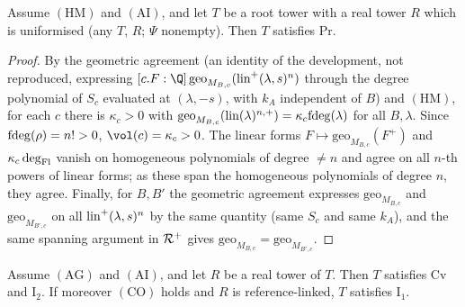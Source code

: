 \begin{proposition}[Proportionality]\label{pf:volthm:prop:prop}
Assume $(\mathrm{HM})$ and $(\mathrm{AI})$, and let $T$ be a root tower with a real tower $R$ which
is uniformised (any $T$, $R$; $\Psi$ nonempty). Then $T$ satisfies $\mathrm{Pr}$.
\end{proposition}

\begin{proof}
By the geometric agreement  (an identity of the development, not
reproduced, expressing $[c.F:\Q]\,\mathrm{geo}_{M_{B,c}}(\volthmlin^+(\lambda,s)^n)$ through the degree polynomial of
$S_c$ evaluated at $(\lambda,-s)$, with $k_A$ independent of $B$) and $(\mathrm{HM})$, for each $c$ there is
$\kappa_c>0$ with $\mathrm{geo}_{M_{B,c}}(\mathrm{lin}(\lambda)^{n,+})=\kappa_c\mathrm{fdeg}(\lambda)$ for all $B,\lambda$.
Since $\mathrm{fdeg}(\rho)=n!>0$, $\vol(c)=\kappa_c>0$. The linear forms
$F\mapsto\mathrm{geo}_{M_{B,c}}(F^+)$ and $\kappa_c\deg_{\mathrm{Fl}}$ vanish on homogeneous polynomials of degree $\ne n$ and
agree on all $n$-th powers of linear forms; as these span the homogeneous polynomials of degree $n$, they agree.
Finally, for $B,B'$ the geometric agreement expresses $\mathrm{geo}_{M_{B,c}}$ and $\mathrm{geo}_{M_{B',c}}$ on all
$\mathrm{lin}^+(\lambda,s)^n$ by the same quantity (same $S_c$ and same $k_A$), and the same spanning argument in
$\mathcal{R}^+$ gives $\mathrm{geo}_{M_{B,c}}=\mathrm{geo}_{M_{B',c}}$.
\end{proof}

\begin{proposition}\label{pf:volthm:prop:I12}
Assume $(\mathrm{AG})$ and $(\mathrm{AI})$, and let $R$ be a real tower of $T$. Then $T$ satisfies
$\mathrm{Cv}$ and $\mathrm{I}_2$. If moreover $(\mathrm{CO})$ holds and $R$ is reference-linked, $T$
satisfies $\mathrm{I}_1$.
\end{proposition}

